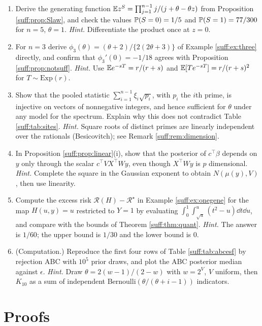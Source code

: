 \begin{enumerate}[label=\arabic*.,ref=\arabic*,leftmargin=2em,itemsep=4pt]
\item Derive the generating function $\mathbb{E} z^S=\prod_{j=1}^{n-1}j/(j+\theta-\theta z)$ from
Proposition \ref{suff:prop:Slaw}, and check the values $\mathbb{P}(S=0)=1/5$ and
$\mathbb{P}(S=1)=77/300$ for $n=5$, $\theta=1$.
\emph{Hint.} Differentiate the product once at $z=0$.

\item For $n=3$ derive $\phi_3(\theta)=(\theta+2)/\{2(2\theta+3)\}$ of Example
\ref{suff:ex:three} directly, and confirm that $\phi_3'(0)=-1/18$ agrees with Proposition
\ref{suff:prop:notsuff}.
\emph{Hint.} Use $\mathbb{E} e^{-sT}=r/(r+s)$ and $\mathbb{E}[Te^{-sT}]=r/(r+s)^2$ for $T\sim\mathrm{Exp}(r)$.

\item \label{suff:ex:primes}
Show that the pooled statistic $\sum_{i=1}^{n-1}\xi_i\sqrt{p_i}$, with $p_i$ the $i$th prime,
is injective on vectors of nonnegative integers, and hence sufficient for $\theta$ under any
model for the spectrum. Explain why this does not contradict Table \ref{suff:tab:sites}.
\emph{Hint.} Square roots of distinct primes are linearly independent over the rationals
(Besicovitch); see Remark \ref{suff:rem:dimension}.

\item In Proposition \ref{suff:prop:linear}(i), show that the posterior of $c^\top\beta$
depends on $y$ only through the scalar $c^\top VX^\top Wy$, even though $X^\top Wy$ is
$p$ dimensional.
\emph{Hint.} Complete the square in the Gaussian exponent to obtain $N(\mu(y),V)$, then use
linearity.

\item Compute the excess risk $\mathcal{R}(H)-\mathcal{R}^\star$ in Example
\ref{suff:ex:onegene} for the map $H(u,y)=u$ restricted to $Y=1$ by evaluating
$\int_0^1\int_{\sqrt u}^{u}(t^2-u)\dd t\dd u$, and compare with the bounds of Theorem
\ref{suff:thm:quant}.
\emph{Hint.} The answer is $1/60$; the upper bound is $1/30$ and the lower bound is $0$.

\item (Computation.) Reproduce the first four rows of Table \ref{suff:tab:abcesf} by rejection
ABC with $10^5$ prior draws, and plot the ABC posterior median against $\epsilon$.
\emph{Hint.} Draw $\theta=2(w-1)/(2-w)$ with $w=2^V$, $V$ uniform, then $K_{10}$ as a sum of
independent Bernoulli$(\theta/(\theta+i-1))$ indicators.
\end{enumerate}

\section{Proofs}
\label{suff:app:proofs2}

